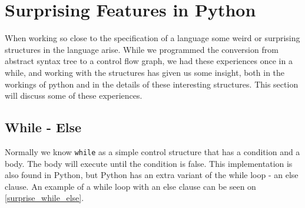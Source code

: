 \section{Surprising Features in Python}
When working so close to the specification of a language some weird or surprising structures in the language arise.
While we programmed the conversion from abstract syntax tree to a control flow graph, we had these experiences once in a while, and working with the structures has given us some insight, both in the workings of python and in the details of these interesting structures.
This section will discuss some of these experiences.

\subsection{While - Else}
Normally we know \texttt{while} as a simple control structure that has a condition and a body.
The body will execute until the condition is false.
This implementation is also found in Python, but Python has an extra variant of the while loop - an else clause.
An example of a while loop with an else clause can be seen on \cref{surprise_while_else}.

